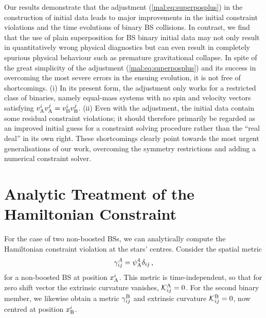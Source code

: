 Our results demonstrate that
the adjustment (\ref{mal:eq:superposplus}) in the construction of initial
data leads to major improvements in the initial constraint violations and the
time evolutions of binary BS collisions. In contrast, we find that the use of plain
superposition for BS binary initial data may not only result in quantitatively
wrong physical diagnostics but can even result in completely spurious physical behaviour
such as premature gravitational collapse. In spite of the great simplicity of the
adjustment (\ref{mal:eq:superposplus}) and its success in overcoming the most
severe errors in the ensuing evolution, it is not free of shortcomings.
(i) In its present form, the adjustment only works for a restricted class of
binaries, namely equal-mass systems with no spin and velocity vectors
satisfying $v_{\rm A}^i v_{\rm A}^j=v_{\rm B}^i v_{\rm B}^j$. (ii) Even with
the adjustment, the initial data contain some residual constraint violations;
it should therefore primarily be regarded as an improved initial guess for
a constraint solving procedure rather than the ``real deal'' in its own right.
These shortcomings clearly point towards the most urgent generalisations of our
work, overcoming the symmetry restrictions and adding a numerical constraint
solver.



\section{Analytic Treatment of the Hamiltonian Constraint}
\label{mal:sec:hamanalytic}

For the case of two non-boosted BSs, we can analytically
compute the Hamiltonian constraint violation
at the stars' centres. Consider the spatial metric
%
%
\begin{equation}
    \gamma_{ij}^{A} = \psi_{\rm A}^4 \delta_{ij}\,,\label{mal:eqn:appendixansatzmetric}
\end{equation}
%
for a non-boosted BS at position $x_{\rm A}^i$.
This metric is time-independent,
so that for zero shift vector the extrinsic curvature vanishes,
%
${\mathcal{K}}_{ij}^{\rm A} = 0$.
%
For the second binary member, we likewise obtain a
metric $\gamma^{\rm B}_{ij}$ and extrinsic curvature
${\mathcal{K}}^{\rm B}_{ij}=0$, now centred at position $x_{\rm B}^i$.

